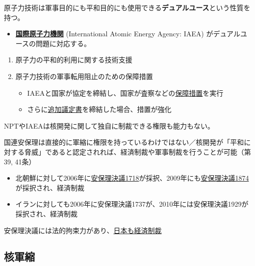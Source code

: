 \documentclass[
  xelatex,
  ja=standard]{bxjsarticle}
\providecommand{\tightlist}{%
  \setlength{\itemsep}{0pt}\setlength{\parskip}{0pt}}\usepackage{longtable,booktabs,array}
\begin{document}
原子力技術は軍事目的にも平和目的にも使用できる\textbf{デュアルユース}という性質を持つ。

\begin{itemize}
\tightlist
\item
  \href{https://www.mofa.go.jp/mofaj/gaiko/atom/iaea/iaea_g.html}{\textbf{国際原子力機関}}
  (International Atomic Energy Agency: IAEA)
  がデュアルユースの問題に対応する。
\end{itemize}

\begin{enumerate}
\def\labelenumi{\arabic{enumi}.}
\tightlist
\item
  原子力の平和的利用に関する技術支援
\item
  原子力技術の軍事転用阻止のための保障措置

  \begin{itemize}
  \tightlist
  \item
    IAEAと国家が協定を締結し、国家が査察などの\href{https://www.nsr.go.jp/activity/hoshousochi/houhou/index.html}{保障措置}を実行
  \item
    さらに\href{https://www.nsr.go.jp/activity/hoshousochi/iaea/iaea2.html}{追加議定書}を締結した場合、措置が強化
  \end{itemize}
\end{enumerate}

NPTやIAEAは核開発に関して独自に制裁できる権限も能力もない。

国連安保理は直接的に軍縮に権限を持っているわけではない／核開発が「平和に対する脅威」であると認定されれば、経済制裁や軍事制裁を行うことが可能（第39,
41条）

\begin{itemize}
\tightlist
\item
  北朝鮮に対して2006年に\href{https://www.mofa.go.jp/mofaj/area/n_korea/anpo1718.html}{安保理決議1718}が採択、2009年にも\href{https://www.mofa.go.jp/mofaj/area/n_korea/anpori1874.html}{安保理決議1874}が採択され、経済制裁
\item
  イランに対しても2006年に安保理決議1737が、2010年には安保理決議1929が採択され、経済制裁
\end{itemize}

安保理決議には法的拘束力があり、\href{https://www.cistec.or.jp/export/keizaiseisai/saikin_keizaiseisai/index.html}{日本も経済制裁}

\hypertarget{ux6838ux8ecdux7e2e}{%
\subsection{核軍縮}\label{ux6838ux8ecdux7e2e}}
\end{document}
